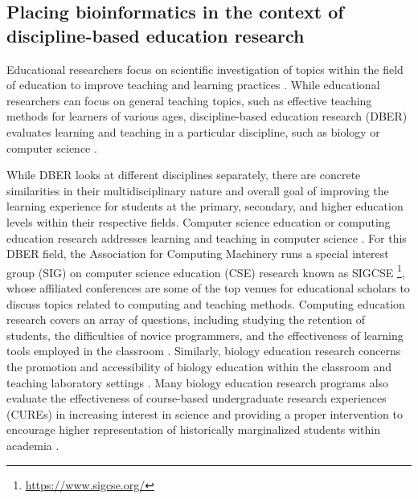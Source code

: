 \subsection{Placing bioinformatics in the context of discipline-based education research}

Educational researchers focus on scientific investigation of topics within the field of education to improve teaching and learning practices \cite{charles1998,nationalresearchcouncilu.s.2005}. While educational researchers can focus on general teaching topics, such as effective teaching methods for learners of various ages, discipline-based education research (DBER) evaluates learning and teaching in a particular discipline, such as biology or computer science \cite{slater2015}. 

While DBER looks at different disciplines separately, there are concrete similarities in their multidisciplinary nature and overall goal of improving the learning experience for students at the primary, secondary, and higher education levels within their respective fields. Computer science education or computing education research addresses learning and teaching in computer science \cite{randolph2008,almstrum2005,cooper2014,pears2005,malmi2010,guzdial2015}. For this DBER field, the Association for Computing Machinery runs a special interest group (SIG) on computer science education (CSE) research known as SIGCSE \footnote{\href{https://www.sigcse.org/}{https://www.sigcse.org/}}, whose affiliated conferences are some of the top venues for educational scholars to discuss topics related to computing and teaching methods. Computing education research covers an array of questions, including studying the retention of students, the difficulties of novice programmers, and the effectiveness of learning tools employed in the classroom \cite{randolph2008,almstrum2005,cooper2014,pears2005,malmi2010,guzdial2015}. Similarly, biology education research concerns the promotion and accessibility of biology education within the classroom and teaching laboratory settings \cite{bahar1999,mintzes2001,labov2010,pranjol2022,brownell2015,heim2019,bakshi2016}. Many biology education research programs also evaluate the effectiveness of course-based undergraduate research experiences (CUREs) in increasing interest in science and providing a proper intervention to encourage higher representation of historically marginalized students within academia \cite{pranjol2022,brownell2015,heim2019,bakshi2016}. 

